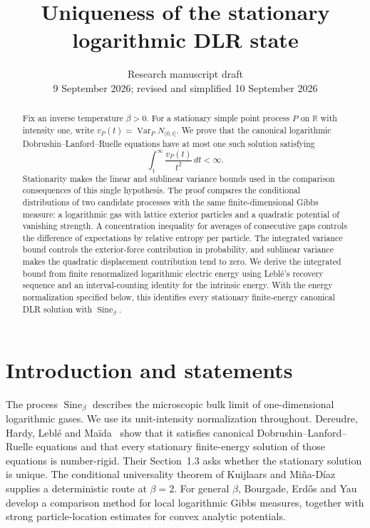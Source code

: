 \documentclass[11pt,reqno]{amsart}
\title[Uniqueness of the logarithmic DLR state]{Uniqueness of the stationary logarithmic DLR state}
\date{Research manuscript draft\\9 September 2026; revised and simplified 10 September 2026}
\numberwithin{equation}{section}
\theoremstyle{definition}
\theoremstyle{remark}
\newcommand{\R}{\mathbb R}
\newcommand{\1}{\mathbf 1}
\newcommand{\Var}{\operatorname{Var}}
\newcommand{\Sine}{\operatorname{Sine}}
\newcommand{\dd}{\,d}
\begin{document}
\begin{abstract}
Fix an inverse temperature $\beta>0$. For a stationary simple point
process $P$ on $\R$ with intensity one, write
$v_P(t)=\Var_P N_{(0,t]}$. We prove that the canonical logarithmic
Dobrushin--Lanford--Ruelle equations have at most one such solution
satisfying
\[
\int_1^\infty\frac{v_P(t)}{t^2}\dd t<\infty.
\]
Stationarity makes the linear and sublinear variance bounds used in
the comparison consequences of this single hypothesis. The proof
compares the conditional distributions of two candidate processes with
the same finite-dimensional Gibbs measure: a logarithmic gas with
lattice exterior particles and a quadratic potential of vanishing
strength. A concentration inequality for averages of consecutive gaps
controls the difference of expectations by relative entropy per
particle. The integrated variance bound controls the exterior-force
contribution in probability, and sublinear variance makes the quadratic
displacement contribution tend to zero. We derive the integrated bound
from finite renormalized logarithmic electric energy using Lebl\'e's
recovery sequence and an interval-counting identity for the intrinsic
energy. With the energy normalization specified below, this identifies
every stationary finite-energy canonical DLR solution with $\Sine_\beta$.
\end{abstract}
\maketitle

\section{Introduction and statements}

The process $\Sine_\beta$ describes the microscopic bulk limit of
one-dimensional logarithmic gases. We use its unit-intensity
normalization throughout. Dereudre, Hardy, Lebl\'e and
Ma\"ida~\cite{DHLM} show that it satisfies canonical Dobrushin--Lanford--Ruelle
equations and that every stationary finite-energy solution of those
equations is number-rigid. Their Section~1.3 asks whether the stationary
solution is unique. The conditional universality theorem of Kuijlaars and
Mi\~na-D\'iaz~\cite{KMD} supplies a deterministic route at $\beta=2$.
For general $\beta$, Bourgade, Erd\H{o}s and Yau~\cite{BEY} develop a
comparison method for local logarithmic Gibbs measures, together with
strong particle-location estimates for convex analytic potentials.
\end{document}
